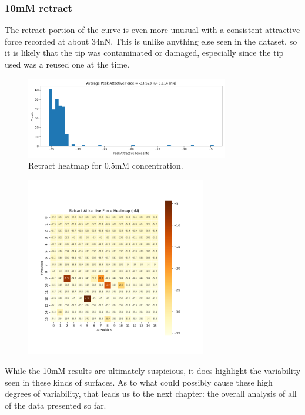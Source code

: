 \newpage
\subsubsection{10mM retract}

The retract portion of the curve is even more unusual with a consistent attractive force recorded at about 34nN. This is unlike anything else seen in the dataset, so it is likely that the tip was contaminated or damaged, especially since the tip used was a reused one at the time.

\begin{figure}[h!!!]
    \centering
    \includegraphics[width=0.79\textwidth]{chapter7/ForceMaps/10mM/contact_force_histogram.png}
    \caption{Retract heatmap for 0.5mM concentration.}
    \label{fig:contfhist}
\end{figure}

\begin{figure}[h!]
\centering
\includegraphics[width=0.7\textwidth]{chapter7/ForceMaps/10mM/Retract_heatmap.png}
\caption{}
\label{fig:pHOverall}
\end{figure}

While the 10mM results are ultimately suspicious, it does highlight the variability seen in these kinds of surfaces. As to what could possibly cause these high degrees of variability, that leads us to the next chapter: the overall analysis of all of the data presented so far.
